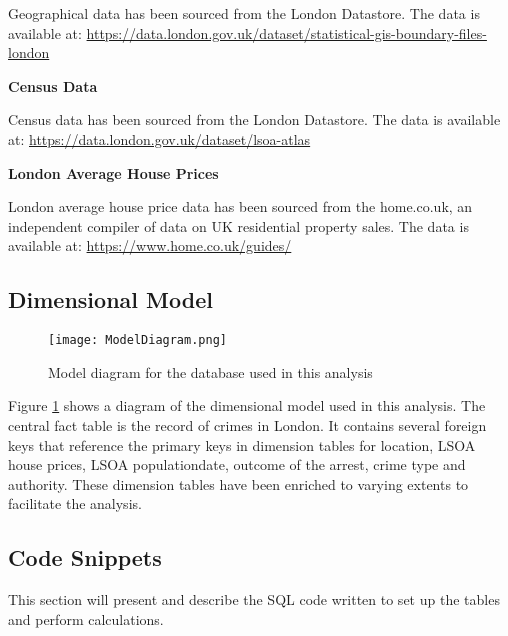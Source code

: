 \documentclass{article}
\begin{document}
Geographical data has been sourced from the London Datastore. The data is available at:
\newline
\href{url}{https://data.london.gov.uk/dataset/statistical-gis-boundary-files-london}
\newline

\noindent
\textbf{Census Data}

Census data has been sourced from the London Datastore. The data is available at:
\newline
\href{url}{https://data.london.gov.uk/dataset/lsoa-atlas}
\newline

\noindent
\textbf{London Average House Prices}

London average house price data has been sourced from the home.co.uk, an independent compiler of data on UK residential property
sales. The data is available at:
\newline
\href{url}{https://www.home.co.uk/guides/}

\newpage
\subsection{Dimensional Model}

\begin{figure}[H]
\begin{center}
  \texttt{[image: ModelDiagram.png]}
  \caption{Model diagram for the database used in this analysis}
  \label{fig:ModelDiagram}
\end{center}
\end{figure}

Figure \ref{fig:ModelDiagram} shows a diagram of the dimensional model used in this analysis. The central fact table is the record of crimes in London. It contains several foreign keys that reference the primary keys in dimension tables for location, LSOA house prices, LSOA populationdate, outcome of the arrest, crime type and authority. These dimension tables have been enriched to varying extents to facilitate the analysis.

\newpage
\subsection{Code Snippets}

This section will present and describe the SQL code written to set up the tables and perform calculations.
\newline
\end{document}
